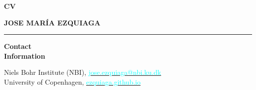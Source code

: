 \documentclass[11pt,a4paper]{article}
\newcommand{\secsize}{0.20\linewidth}
\newcommand{\contsize}{0.80\linewidth}
\newcommand{\sectionsep}{12pt}
\begin{document}
 

\begin{minipage}{0.5\linewidth}
\begin{flushleft}
\large{\textbf{CV}}
\end{flushleft}
\end{minipage}
\begin{minipage}{0.5\linewidth}
\begin{flushright}
\large{\textbf{{JOSE MAR\'IA EZQUIAGA}}}
\end{flushright}
\end{minipage}

\begin{minipage}{\linewidth}
\rule{\linewidth}{1pt}
\end{minipage}

\pagestyle{plain}


\begin{minipage}[t]{\secsize}
\begin{flushleft}
\bf{Contact \\ Information}
\end{flushleft}
\end{minipage}
\begin{minipage}[t]{\contsize}
\begin{flushleft}
{Niels Bohr Institute (NBI)}, \hfill \href{mailto:jose.ezquiaga@nbi.ku.dk}{\textcolor{cyan}{jose.ezquiaga@nbi.ku.dk}} \\
{University of Copenhagen},  \hfill  \href{https://ezquiaga.github.io}{\textcolor{cyan}{ezquiaga.github.io}}\\
\end{flushleft}
\end{minipage}
\end{document}
